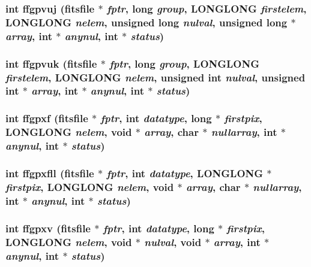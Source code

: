 \subsubsection{\setlength{\rightskip}{0pt plus 5cm}int ffgpvuj (\bf{fitsfile} $\ast$ {\em fptr}, long {\em group}, \bf{LONGLONG} {\em firstelem}, \bf{LONGLONG} {\em nelem}, unsigned long {\em nulval}, unsigned long $\ast$ {\em array}, int $\ast$ {\em anynul}, int $\ast$ {\em status})}\label{fitsio__64_8h_d3a92390525cbe896595a5e30e2c31cb}


\subsubsection{\setlength{\rightskip}{0pt plus 5cm}int ffgpvuk (\bf{fitsfile} $\ast$ {\em fptr}, long {\em group}, \bf{LONGLONG} {\em firstelem}, \bf{LONGLONG} {\em nelem}, unsigned int {\em nulval}, unsigned int $\ast$ {\em array}, int $\ast$ {\em anynul}, int $\ast$ {\em status})}\label{fitsio__64_8h_9d63a49944e89d4debca1080067ca58f}


\subsubsection{\setlength{\rightskip}{0pt plus 5cm}int ffgpxf (\bf{fitsfile} $\ast$ {\em fptr}, int {\em datatype}, long $\ast$ {\em firstpix}, \bf{LONGLONG} {\em nelem}, void $\ast$ {\em array}, char $\ast$ {\em nullarray}, int $\ast$ {\em anynul}, int $\ast$ {\em status})}\label{fitsio__64_8h_64917e68aaefb305612dd26f21565443}


\subsubsection{\setlength{\rightskip}{0pt plus 5cm}int ffgpxfll (\bf{fitsfile} $\ast$ {\em fptr}, int {\em datatype}, \bf{LONGLONG} $\ast$ {\em firstpix}, \bf{LONGLONG} {\em nelem}, void $\ast$ {\em array}, char $\ast$ {\em nullarray}, int $\ast$ {\em anynul}, int $\ast$ {\em status})}\label{fitsio__64_8h_1695916e97fed43202efca40fd7fd573}


\subsubsection{\setlength{\rightskip}{0pt plus 5cm}int ffgpxv (\bf{fitsfile} $\ast$ {\em fptr}, int {\em datatype}, long $\ast$ {\em firstpix}, \bf{LONGLONG} {\em nelem}, void $\ast$ {\em nulval}, void $\ast$ {\em array}, int $\ast$ {\em anynul}, int $\ast$ {\em status})}\label{fitsio__64_8h_bfb2e7a0bf12f295d4907aed0247d9e9}



